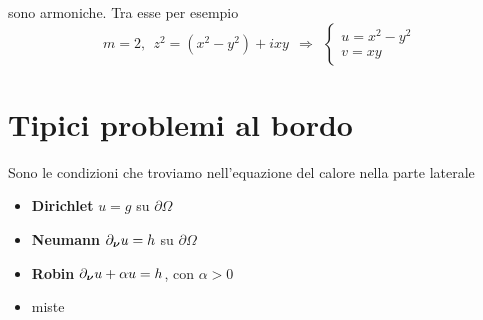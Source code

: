 \begin{itemize}
          sono armoniche. Tra esse per esempio
          \begin{equation*}
              m=2,\ \ z^{2} =\left(x^{2} -y^{2}\right) +ixy\ \ \Rightarrow \ \ \begin{cases}
                  u=x^{2} -y^{2} \\
                  v=xy
              \end{cases}
          \end{equation*}
\end{itemize}
\section{Tipici problemi al bordo}

Sono le condizioni che troviamo nell'equazione del calore nella parte laterale
\begin{itemize}
    \item \textbf{Dirichlet} $u=g$ su $\partial \Omega $
    \item \textbf{Neumann} $\partial _{\bm{\nu} } u=h$ su $\partial \Omega $
    \item \textbf{Robin} $\partial _{\bm{\nu} } u+\alpha u=h$, con $\alpha  >0$
    \item miste
\end{itemize}

